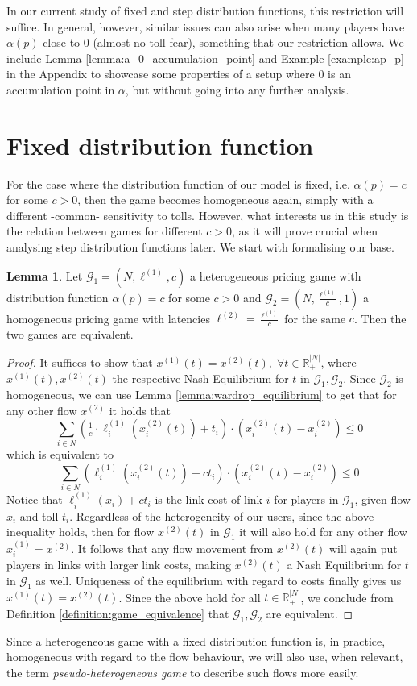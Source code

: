 \documentclass[10pt,a4paper]{book}
\newcommand{\R}{\mathbb{R}}
\newcommand{\Gm}{\mathcal{G}}
\theoremstyle{definition}
\newtheorem{lemma}[definition]{Lemma}
\theoremstyle{comment}
\begin{document}
In our current study of fixed and step distribution functions, this restriction will suffice.
In general, however, similar issues can also arise when many players have $\alpha(p)$ close to $0$ (almost no toll fear), something that our restriction allows.
We include Lemma \ref{lemma:a_0_accumulation_point} and Example \ref{example:ap_p} in the Appendix to showcase some properties of a setup where $0$ is an accumulation point in $\alpha$, but without going into any further analysis.

\section{Fixed distribution function}

For the case where the distribution function of our model is fixed, i.e. $\alpha(p) = c$ for some $c > 0$, then the game becomes homogeneous again, simply with a different -common- sensitivity to tolls.
However, what interests us in this study is the relation between games for different $c > 0$, as it will prove crucial when analysing step distribution functions later.
We start with formalising our base.

\begin{lemma}
	\label{lemma:a_fixed_homogeneous}
	Let $\Gm_1 = (N, \ell^{(1)}, c)$ a heterogeneous pricing game with distribution function $\alpha(p) = c$ for some $c > 0$ and $\Gm_2 = (N, \frac{\ell^{(1)}}{c}, 1)$ a homogeneous pricing game with latencies $\ell^{(2)} = \frac{\ell^{(1)}}{c}$ for the same $c$.
	Then the two games are equivalent.
\end{lemma}

\begin{proof}
	It suffices to show that $x^{(1)}(t) = x^{(2)}(t), \; \forall t \in \R_+^{|N|}$, where $x^{(1)}(t), x^{(2)}(t)$ the respective Nash Equilibrium for $t$ in $\Gm_1, \Gm_2$.
	Since $\Gm_2$ is homogeneous, we can use Lemma \ref{lemma:wardrop_equilibrium} to get that for any other flow $x^{(2)}$ it holds that
	\[
		\sum_{i \in N} \left(\tfrac1c \cdot \ell_i^{(1)}(x_i^{(2)}(t)) + t_i\right) \cdot \left(x_i^{(2)}(t) - x_i^{(2)}\right) \leq 0
	\]
	which is equivalent to
	\[
		\sum_{i \in N} \left(\ell_i^{(1)}(x_i^{(2)}(t)) + c t_i\right) \cdot \left(x_i^{(2)}(t) - x_i^{(2)}\right) \leq 0
	\]
	Notice that $\ell_i^{(1)}(x_i) + c t_i$ is the link cost of link $i$ for players in $\Gm_1$, given flow $x_i$ and toll $t_i$.
	Regardless of the heterogeneity of our users, since the above inequality holds, then for flow $x^{(2)}(t)$ in $\Gm_1$ it will also hold for any other flow $x_i^{(1)} = x^{(2)}$.
	It follows that any flow movement from $x^{(2)}(t)$ will again put players in links with larger link costs, making $x^{(2)}(t)$ a Nash Equilibrium for $t$ in $\Gm_1$ as well.
	Uniqueness of the equilibrium with regard to costs finally gives us $x^{(1)}(t) = x^{(2)}(t)$.
	Since the above hold for all $t \in \R_+^{|N|}$, we conclude from Definition \ref{definition:game_equivalence} that $\Gm_1, \Gm_2$ are equivalent.
\end{proof}
Since a heterogeneous game with a fixed distribution function is, in practice, homogeneous with regard to the flow behaviour, we will also use, when relevant, the term \textit{pseudo-heterogeneous game} to describe such flows more easily.
\end{document}
